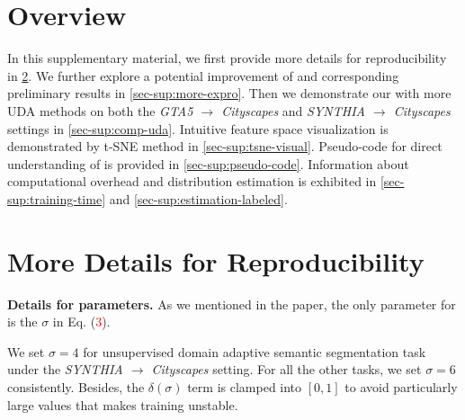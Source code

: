 




\section{Overview}
In this supplementary material, we first provide more details for reproducibility in \cref{sec-sup:reprodu}.
%
We further explore a potential improvement of \method and corresponding preliminary results in \cref{sec-sup:more-expro}.
%
Then we demonstrate our \method with more UDA methods on both the \textit{GTA5 $\to$ Cityscapes} and \textit{SYNTHIA $\to$ Cityscapes} settings in \cref{sec-sup:comp-uda}.
%
Intuitive feature space visualization is demonstrated by t-SNE method in \cref{sec-sup:tsne-visual}.
%
Pseudo-code for direct understanding of \method is provided in \cref{sec-sup:pseudo-code}.
%
Information about computational overhead and distribution estimation is exhibited in \cref{sec-sup:training-time} and \cref{sec-sup:estimation-labeled}.




\section{More Details for Reproducibility}\label{sec-sup:reprodu}
\noindent \textbf{Details for parameters.}
As we mentioned in the paper, the only parameter for \method is the $\sigma$ in Eq. (\textcolor{red}{3}).

We set $\sigma=4$ for unsupervised domain adaptive semantic segmentation task under the \textit{SYNTHIA $\to$ Cityscapes} setting.
%
For all the other tasks, we set $\sigma=6$ consistently.
%
Besides, the $\delta(\sigma)$ term is clamped into $\left[0, 1\right]$ to avoid particularly large values that makes training unstable.




